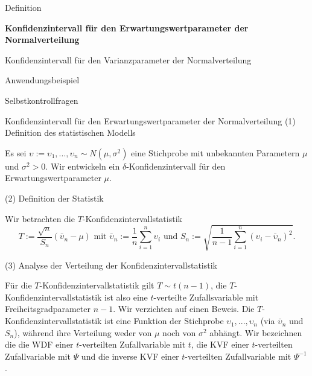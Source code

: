 \documentclass[
  8pt,
  ignorenonframetext,
]{beamer}
\newcommand{\ups} {\upsilon}
\begin{document}
\begin{frame}{}
\protect\hypertarget{section-7}{}
\large

Definition

\normalsize

\textbf{Konfidenzintervall für den Erwartungswertparameter der
Normalverteilung}

\large

Konfidenzintervall für den Varianzparameter der Normalverteilung

Anwendungsbeispiel

Selbstkontrollfragen
\end{frame}

\begin{frame}{Konfidenzintervall für den Erwartungswertparameter der
Normalverteilung}
\protect\hypertarget{konfidenzintervall-fuxfcr-den-erwartungswertparameter-der-normalverteilung}{}
\noindent (1) Definition des statistischen Modells

\small

Es sei \(\ups := \ups_1,...,\ups_n \sim N(\mu,\sigma^2)\) eine
Stichprobe mit unbekannten Parametern \(\mu\) und \(\sigma^2 > 0\). Wir
entwickeln ein \(\delta\)-Konfidenzintervall für den
Erwartungswertparameter \(\mu\). \vspace{2mm}

\normalsize

\noindent (2) Definition der Statistik \small

Wir betrachten die \(T\)-Konfidenzintervallstatistik \begin{equation}
T := \frac{\sqrt{n}}{S_n}(\bar{\ups}_n - \mu) \mbox{ mit } \bar{\ups}_n := \frac{1}{n}\sum_{i=1}^n \ups_i \mbox{  und } S_n := \sqrt{\frac{1}{n-1}\sum_{i=1}^n(\ups_i - \bar{\ups}_n)^2}.
\end{equation}

\normalsize

\noindent (3) Analyse der Verteilung der Konfidenzintervallstatistik

\small

Für die \(T\)-Konfidenzintervallstatistik gilt \(T \sim t(n - 1)\), die
\(T\)-Konfidenzintervallstatistik ist also eine \(t\)-verteilte
Zufallsvariable mit Freiheitsgradparameter \(n-1\). Wir verzichten auf
einen Beweis. Die \(T\)-Konfidenzintervallstatistik ist eine Funktion
der Stichprobe \(\ups_1,...,\ups_n\) (via \(\bar{\ups}_n\) und \(S_n\)),
während ihre Verteilung weder von \(\mu\) noch von \(\sigma^2\) abhängt.
Wir bezeichnen die die WDF einer \(t\)-verteilten Zufallvariable mit
\(t\), die KVF einer \(t\)-verteilten Zufallvariable mit \(\Psi\) und
die inverse KVF einer \(t\)-verteilten Zufallvariable mit \(\Psi^{-1}\).
\end{frame}
\end{document}
